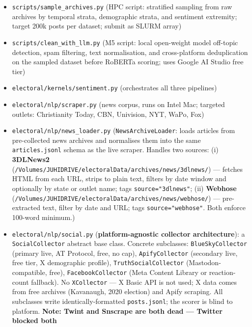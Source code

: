 \documentclass[11pt]{article}
\begin{document}
\begin{itemize}[leftmargin=1.6em, itemsep=2pt]
  \item \texttt{scripts/sample\_archives.py} (HPC script: stratified sampling
        from raw archives by temporal strata, demographic strata, and sentiment
        extremity; target 200k posts per dataset; submit as SLURM array)
  \item \texttt{scripts/clean\_with\_llm.py} (M5 script: local open-weight model
        off-topic detection, spam filtering, text normalisation, and
        cross-platform deduplication on the sampled dataset before RoBERTa
        scoring; uses Google AI Studio free tier)
  \item \texttt{electoral/kernels/sentiment.py} (orchestrates all three pipelines)
  \item \texttt{electoral/nlp/scraper.py} (news corpus, runs on Intel Mac;
        targeted outlets: Christianity Today, CBN, Univision, NYT, WaPo, Fox)
  \item \texttt{electoral/nlp/news\_loader.py} (\texttt{NewsArchiveLoader}:
        loads articles from pre-collected news archives and normalises them
        into the same \texttt{articles.jsonl} schema as the live scraper.
        Handles two sources: (i) \textbf{3DLNews2}
        (\texttt{/Volumes/JUHIDRIVE/electoralData/archives/news/3dlnews/}) ---
        fetches HTML from each URL, strips to plain text, filters by date window
        and optionally by state or outlet name; tags \texttt{source="3dlnews"};
        (ii) \textbf{Webhose}
        (\texttt{/Volumes/JUHIDRIVE/electoralData/archives/news/webhose/}) ---
        pre-extracted text, filter by date and URL; tags
        \texttt{source="webhose"}. Both enforce 100-word minimum.)
  \item \texttt{electoral/nlp/social.py} (\textbf{platform-agnostic collector
        architecture}): a \texttt{SocialCollector} abstract base class.
        Concrete subclasses:
        \texttt{BlueSkyCollector} (primary live, AT Protocol, free, no cap),
        \texttt{ApifyCollector} (secondary live, free tier, X demographic profile),
        \texttt{TruthSocialCollector} (Mastodon-compatible, free),
        \texttt{FacebookCollector} (Meta Content Library or reaction-count fallback).
        No \texttt{XCollector} --- X Basic API is not used; X data comes from
        free archives (Kavanaugh, 2020 election) and Apify scraping.
        All subclasses write identically-formatted \texttt{posts.jsonl};
        the scorer is blind to platform.
        \textbf{Note: Twint and Snscrape are both dead --- Twitter blocked both
}
\end{itemize}
\end{document}
